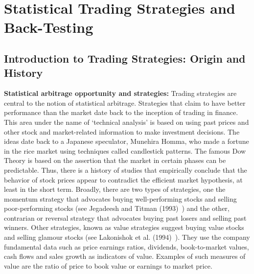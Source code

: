 \chapter{Statistical Trading Strategies and Back-Testing\label{ch:stat_ts}} \label{in:sta1}
\section{Introduction to Trading Strategies: Origin and History\label{sec:intro_trade_strateg}}

\noindent\textbf{Statistical arbitrage opportunity and strategies:} Trading strategies are central to the notion of statistical arbitrage. Strategies that claim to have better performance than the market date back to the inception of trading in finance. This area under the name of `technical analysis' is based on using past prices and other stock and market-related information to make investment decisions. The ideas date back to a Japanese speculator, Munehira Homma, who made a fortune in the rice market using techniques called candlestick patterns. The famous Dow Theory is based on the assertion that the market in certain phases can be predictable. Thus, there is a history of studies that empirically conclude that the behavior of stock prices appear to contradict the efficient market hypothesis, at least in the short term. Broadly, there are two types of strategies, one the momentum strategy\label{in:mom1} that advocates buying well-performing stocks and selling poor-performing stocks (see Jegadeesh and Titman (1993)~\cite{JeTit}) and the other, contrarian or reversal strategy that advocates buying past losers and selling past winners.\label{in:contrary} Other strategies, known as value strategies suggest buying value stocks and selling glamour stocks (see Lakonishok et al. (1994)~\cite{Lako}). They use the company fundamental data such as price earnings ratios, dividends, book-to-market values, cash flows and sales growth as indicators of value. Examples of such measures of value are the ratio of price to book value or earnings to market price.



